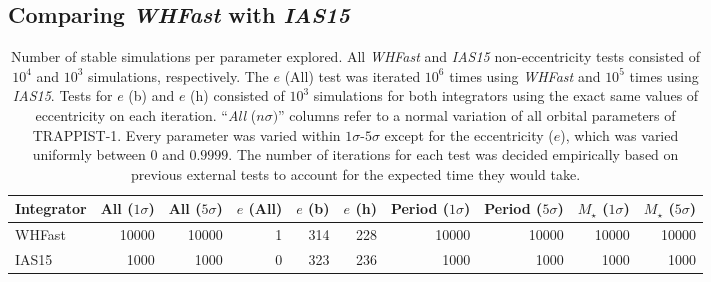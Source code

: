 \documentclass{aa}
\begin{document}
%




\begin{appendix}

\onecolumn
\section{Comparing \textit{WHFast} with \textit{IAS15}}
\begin{table}[!ht]
    \centering
    \caption{Number of stable simulations per parameter explored. All \textit{WHFast} and \textit{IAS15} non-eccentricity tests consisted of $10^4$ and $10^3$ simulations, respectively. The $e$ (All) test was iterated $10^6$ times using \textit{WHFast} and $10^5$ times using \textit{IAS15}. Tests for $e$ (b) and $e$ (h) consisted of $10^3$ simulations for both integrators using the exact same values of eccentricity on each iteration. ``\textit{All} ($n\sigma)$'' columns refer to a normal variation of all orbital parameters of TRAPPIST-1. Every parameter was varied within $1\sigma$-$5\sigma$ except for the eccentricity ($e$), which was varied uniformly between $0$ and $0.9999$. The number of iterations for each test was decided empirically based on previous external tests to account for the expected time they would take.}
    \begin{tabular}{lrrrrrrrrr}
    \hline
        Integrator & All ($1\sigma$) & All ($5\sigma$) & $e$ (All) & $e$ (b) & $e$ (h) & Period ($1\sigma$) & Period ($5\sigma$) & $M_{\star}$ ($1\sigma$) & $M_{\star}$ ($5\sigma$) \\ \hline
        WHFast & 10000 & 10000 & 1 & 314 & 228 & 10000 & 10000 & 10000 & 10000 \\ 
        IAS15 & 1000 & 1000 & 0 & 323 & 236 & 1000 & 1000 & 1000 & 1000 \\ \hline
    \end{tabular}
    \label{tab:whfast_vs_ias15}
\end{table}


\end{appendix}
\end{document}
